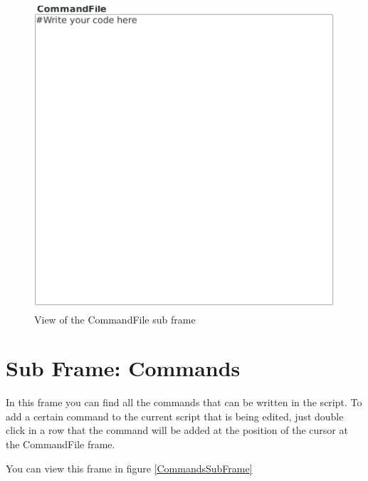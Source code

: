 \documentclass[pdftex,11pt,a4paper,titlepage]{report}
\begin{document}
\begin{figure}[h]
\centering
\includegraphics[scale=0.6]{../images/CommandFileSubFrame.png}
\caption{View of the CommandFile sub frame}
\label{CommandFileSubFrame}
\end{figure}
\section{Sub Frame: Commands}
\hspace{0.4cm} In this frame you can find all the commands that can be written in the script. To add a certain command to the current script that is being edited, just double click in a row that the command will be added at the position of the cursor at the CommandFile frame. 

You can view this frame in figure \ref{CommandsSubFrame}
\end{document}
